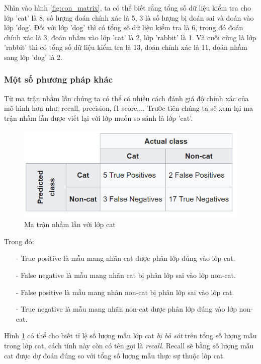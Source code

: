 Nhìn vào hình \ref{fig:con_matrix}, ta có thể biết rằng tổng số dữ liệu kiểm tra cho lớp 'cat' là 8, số lượng đoán chính xác là 5, 3 là số lượng bị đoán sai và đoán vào lớp 'dog'. Đối với lớp 'dog' thì có tổng số dữ liệu kiểm tra là 6, trong đó đoán chính xác là 3, đoán nhầm vào lớp 'cat' là 2, lớp 'rabbit' là 1. Và cuối cùng là lớp 'rabbit' thì có tổng số dữ liệu kiểm tra là 13, đoán chính xác là 11, đoán nhầm sang lớp 'dog' là 2.
\subsubsection{Một số phương pháp khác}
Từ ma trận nhầm lẫn chúng ta có thể có nhiều cách đánh giá độ chính xác của mô hình hơn như: recall, precision, f1-score,... Trước tiên chúng ta sẽ xem lại ma trận nhầm lẫn được viết lại với lớp muốn so sánh là lớp 'cat'.
\begin{figure}[H]
\begin{center}
\includegraphics[scale=1]{chap3/image/confusionmatrix6.png}
\end{center}
\caption{Ma trận nhầm lẫn với lớp cat}
\label{fig:confus2}
\end{figure}
\hspace{0cm} Trong đó:
\begin{itemize}
\item[-]True positive là mẫu mang nhãn cat được phân lớp đúng vào lớp cat. 
\item[-]False negative là mẫu mang nhãn cat bị phân lớp sai vào lớp non-cat.
\item[-]False positive là mẫu mang nhãn non-cat bị phân lớp sai vào lớp cat.
\item[-]True negative là mẫu mang nhãn non-cat được phân lớp đúng vào lớp non-cat.
\end{itemize}
Hình \ref{fig:confus2} có thể cho biết tỉ lệ số lượng mẫu lớp cat \textit{bị bỏ sót} trên tổng số lượng mẫu trong lớp cat, cách tính này còn có tên gọi là \textit{recall}. Recall sẽ bằng số lượng mẫu cat được dự đoán đúng so với tổng số lượng mẫu thực sự thuộc lớp cat.
